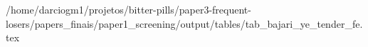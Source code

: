 /home/darciogm1/projetos/bitter-pills/paper3-frequent-losers/papers_finais/paper1_screening/output/tables/tab_bajari_ye_tender_fe.tex
